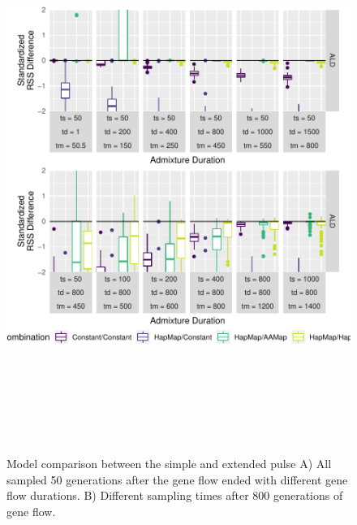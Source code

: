 \documentclass[11pt]{article}
\begin{document}
\begin{figure}
\centering
\includegraphics[width=16cm,height=18cm,keepaspectratio]{ATE_Revisions_files/figure-latex/figCloser_Sampling_RSS_Supplement-1.pdf}
\caption{\label{fig:figResult3_4_supplements} Model comparison between the simple and extended pulse  A) All sampled 50 generations after the gene flow ended with different gene flow durations. B)
Different sampling times after 800 generations of gene flow.}
\end{figure}
\end{document}
